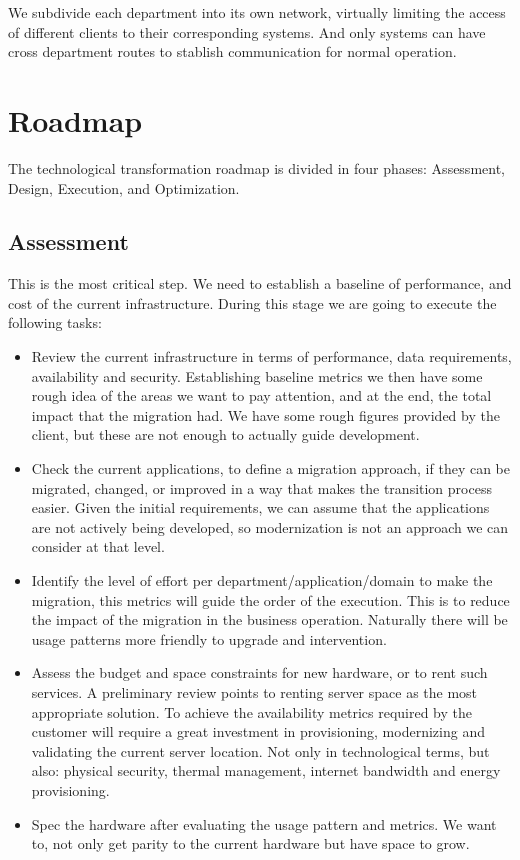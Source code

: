 \documentclass{llncs}
\begin{document}
We subdivide each department into its own network, virtually limiting the access of different clients to their corresponding systems. And only systems can have cross department routes to stablish communication for normal operation. 

\section{Roadmap}

The technological transformation roadmap is divided in four phases: Assessment, Design, Execution, and Optimization.

\subsection{Assessment}
This is the most critical step. We need to establish a baseline of performance, and cost of the current infrastructure. During this stage we are going to execute the following tasks:

\begin{itemize}

  \item Review the current infrastructure in terms of performance, data requirements, availability and security. Establishing baseline metrics we then have some rough idea of the areas we want to pay attention, and  at the end, the total impact that the migration had. We have some rough figures provided by the client, but these are not enough to actually guide development.
  \item Check the current applications, to define a migration approach, if they can be migrated, changed, or improved in a way that makes the transition process easier. Given the initial requirements, we can assume that the applications are not actively being developed, so modernization is not an approach we can consider at that level.
  \item Identify the level of effort per department/application/domain to make the migration, this metrics will guide the order of the execution. This is to reduce the impact of the migration in the business operation. Naturally there will be usage patterns more friendly to upgrade and intervention.
  \item Assess the budget and space constraints for new hardware, or to rent such services. A preliminary review points to renting server space as the most appropriate solution. To achieve the availability metrics required by the customer will require a great investment in provisioning, modernizing and validating the current server location. Not only in technological terms, but also: physical security, thermal management, internet bandwidth and energy provisioning.
  \item Spec the hardware after evaluating the usage pattern and metrics. We want to, not only get parity to the current hardware but have space to grow.
\end{itemize}
\end{document}
